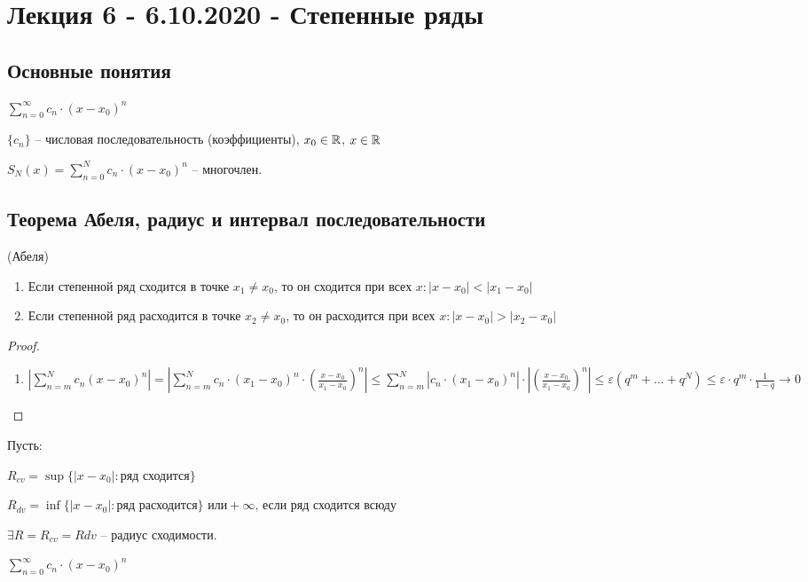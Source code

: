 \section{Лекция 6 - 6.10.2020 - Степенные ряды}
\subsection{Основные понятия}
$\sum_{n=0}^{\infty} c_n \cdot(x - x_0)^n$

$\{c_n\}$ -- числовая последовательность (коэффициенты), $x_0 \in \mathbb{R}$, $x \in \mathbb{R}$

$S_N(x) = \sum_{n=0}^N c_n \cdot (x - x_0)^n$ -- многочлен.
\subsection{Теорема Абеля, радиус и интервал последовательности}
\begin{theorem}
(Абеля)
\begin{enumerate}
\item Если степенной ряд сходится в точке $x_1 \neq x_0$, то он сходится при всех $x : |x - x_0| < |x_1 - x_0|$
\item Если степенной ряд расходится в точке $x_2 \neq x_0$, то он расходится при всех $x : |x - x_0| > |x_2 - x_0|$
\end{enumerate}
\end{theorem}

\begin{proof}
\begin{enumerate}
\item $\left|\sum_{n = m}^{N} c_n (x - x_0)^n\right| = \left|\sum_{n = m}^{N} c_n \cdot (x_1 - x_0)^n \cdot \left(\frac{x-x_0}{x_1 - x_0}\right)^n\right| \leq 
\sum_{n = m}^{N} \left|c_n \cdot (x_1 - x_0)^n \right| \cdot \left|\left(\frac{x-x_0}{x_1 - x_0}\right)^n\right| \leq \varepsilon (q^m + \dots + q^N) \leq \varepsilon \cdot q^m \cdot \frac{1}{1-q} \to 0$
\end{enumerate}
\end{proof}

Пусть:

$R_{cv} = \sup \{|x - x_0|: \text{ряд сходится}\}$

$R_{dv} = \inf \{|x - x_0|: \text{ряд расходится}\} \text{ или} +\infty \text{, если ряд сходится всюду}$

$\exists R = R_{cv} = R{dv}$ -- радиус сходимости.

$\sum_{n=0}^{\infty} c_n \cdot(x - x_0)^n$

